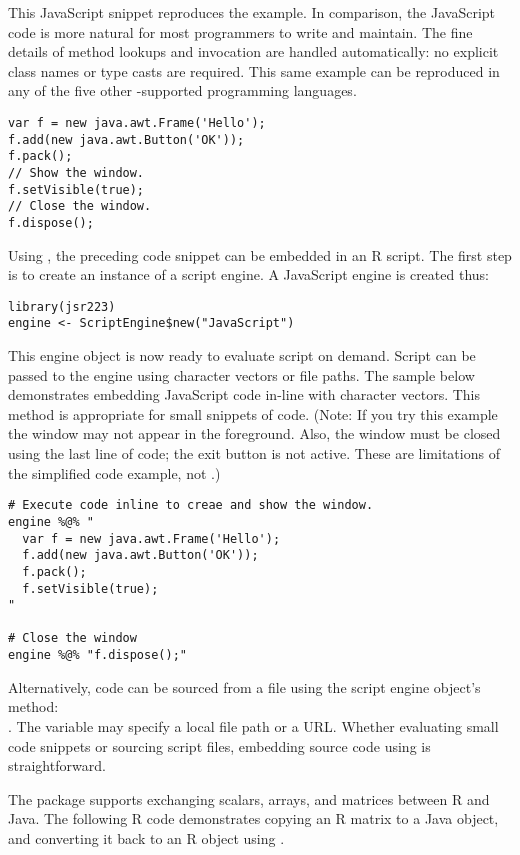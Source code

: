 This JavaScript snippet reproduces the  example. In comparison, the JavaScript code is more natural for most programmers to write and maintain. The fine details of method lookups and invocation are handled automatically: no explicit class names or type casts are required. This same example can be reproduced in any of the five other -supported programming languages.

\begin{verbatim}
var f = new java.awt.Frame('Hello');
f.add(new java.awt.Button('OK'));
f.pack();
// Show the window.
f.setVisible(true);
// Close the window.
f.dispose();
\end{verbatim}
Using , the preceding code snippet can be embedded in an R script. The first step is to create an instance of a script engine. A JavaScript engine is created thus:

\begin{verbatim}
library(jsr223)
engine <- ScriptEngine$new("JavaScript")
\end{verbatim}
This engine object is now ready to evaluate script on demand. Script can be passed to the engine using character vectors or file paths. The sample below demonstrates embedding JavaScript code in-line with character vectors. This method is appropriate for small snippets of code. (Note: If you try this example the window may not appear in the foreground. Also, the window must be closed using the last line of code; the exit button is not active. These are limitations of the simplified code example, not .)

\begin{verbatim}
# Execute code inline to creae and show the window.
engine %@% "
  var f = new java.awt.Frame('Hello');
  f.add(new java.awt.Button('OK'));
  f.pack();
  f.setVisible(true);
"

# Close the window
engine %@% "f.dispose();"
\end{verbatim}
Alternatively, code can be sourced from a file using the script engine object's  method: \\
. The variable  may specify a local file path or a URL. Whether evaluating small code snippets or sourcing script files, embedding source code using  is straightforward.

The  package supports exchanging scalars, arrays, and matrices between R and Java. The following R code demonstrates copying an R matrix to a Java object, and converting it back to an R object using .

